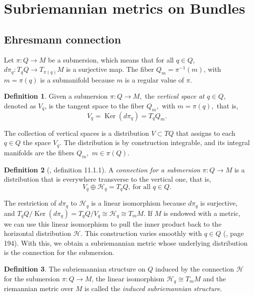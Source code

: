 \documentclass[12pt, letterpaper, reqno]{amsart}
\theoremstyle{definition}
\newtheorem{df}{Definition}
\theoremstyle{plain}
\theoremstyle{remark}
\begin{document}
\section{Subriemannian metrics on Bundles}%
\label{sec:metrics_on_bundles}
\subsection{Ehresmann connection}%
\label{sub:ehresmann_connection}


Let $ \pi : Q \rightarrow {M} $ be a submersion, which means that for all $ q\in Q $, $ d\pi_q : T_q Q \rightarrow {T_{\pi(q)}}M $ is a surjective map. The fiber $ Q_m = \pi^{-1}(m) $, with $ m=\pi(q) $ is a submanifold because $ m $ is a regular value of $ \pi. $  

\begin{df}
	Given a submersion $ \pi:Q \rightarrow {M}, $ the \textit{vertical space at $ q\in Q $}, denoted as $ V_q $, is the tangent space to the fiber $ Q_m, $ with $ m=\pi(q), $ that is,  
	$$ V_q = \operatorname{Ker}(d\pi_q) = T_q Q_m.  $$ 
\end{df}

The collection of vertical spaces is a distribution $ V \subset TQ $ that assigns to each $ q\in Q $ the space $ V_q. $ The distribution is by construction integrable, and its integral manifolds are the fibers $ Q_m, $ $ m\in \pi(Q). $ 

\begin{df}[\cite{montgomery2002tour}, definition 11.1.1]
	A \textit{connection for a submersion} $ \pi:Q \rightarrow {M} $ is a distribution that is everywhere transverse to the vertical one, that is,  
	$$ V_q \oplus \mathcal{H}_q = T_q Q,\ \text{for all } q\in Q. $$ 
\end{df}

The restriction of $ d\pi_q $ to $ \mathcal{H}_q $ is a linear isomorphism because $ d\pi_q $ is surjective, and $ T_q Q / \operatorname{Ker}(d\pi_q) = T_q Q / V_q \cong \mathcal{H}_q \cong T_m M. $ If $ M $ is endowed with a metric, we can use this linear isomorphism to pull the inner product back to the horizontal distribution $ \mathcal{H}. $ This construction varies smoothly with $ q\in Q $ (\cite{montgomery2002tour}, page 194). With this, we obtain a subriemannian metric whose underlying distribution is the connection for the submersion.

\begin{df}
	The subriemannian structure on $ Q $ induced by the connection $ \mathcal{H} $ for the submersion $ \pi:Q \rightarrow {M} $, the linear isomorphism $ \mathcal{H}_q \cong T_m M $ and the riemannian metric over $ M $ is called the \textit{induced subriemannian structure}. 
\end{df}
\end{document}
